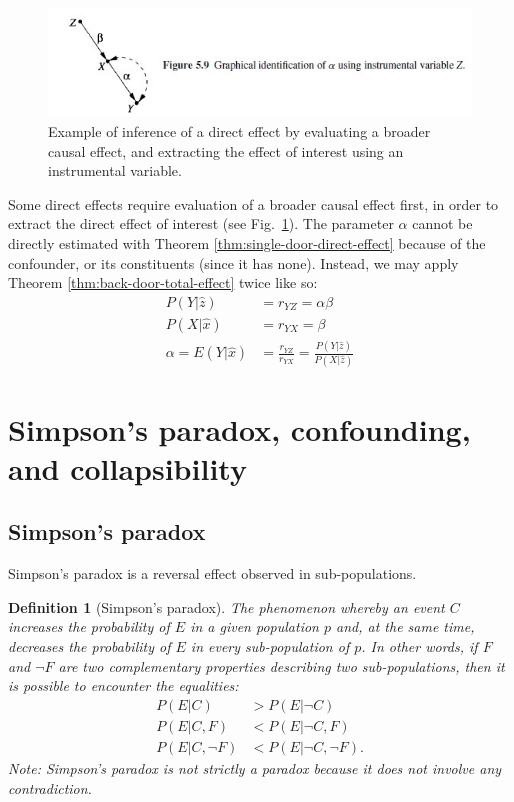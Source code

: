 \documentclass[11pt]{article}
\numberwithin{equation}{section}
\newtheorem{defn}{Definition}[section]
\begin{document}
\begin{figure}
\begin{center}
\includegraphics[width=0.8\columnwidth]{figures/instrumental-variable.jpg}  
\end{center}
\caption{Example of inference of a direct effect by evaluating a broader causal effect, and extracting the effect of interest using an instrumental variable.}
\label{Fig:instrument}
\end{figure}

Some direct effects require evaluation of a broader causal effect first, in order to extract the direct effect of interest (see Fig.~\ref{Fig:instrument}). The parameter $\alpha$ cannot be directly estimated with Theorem \ref{thm:single-door-direct-effect} because of the confounder, or its constituents (since it has none). Instead, we may apply Theorem \ref{thm:back-door-total-effect} twice like so:
\begin{align}
P(Y|\hat{z}) &= r_{YZ} = \alpha \beta \\
P(X|\hat{x}) &= r_{YX} = \beta \\
\alpha = E(Y|\hat{x}) &= \frac{r_{YZ}}{r_{YX}} = \frac{P(Y|\hat{z})}{P(X|\hat{z})}
\end{align}


\section{Simpson's paradox, confounding, and collapsibility} \label{sec:simpson-confounding-collapsibility}

\subsection{Simpson's paradox}
Simpson's paradox is a reversal effect observed in sub-populations.

\begin{defn}[Simpson's paradox]
The phenomenon whereby an event $C$ increases the probability of $E$ in a given population $p$ and, at the same time, decreases the probability of $E$ in every sub-population of $p$. In other words, if $F$ and $\neg F$ are two complementary properties describing two sub-populations, then it is possible to encounter the equalities:
\begin{align}
P(E|C) &> P(E|\neg C) \\
P(E|C,F) &< P(E| \neg C, F) \nonumber \\
P(E|C, \neg F) &< P(E| \neg C, \neg F). \nonumber
\end{align}
Note: Simpson's paradox is not strictly a paradox because it does not involve any contradiction.
\end{defn}
\end{document}
